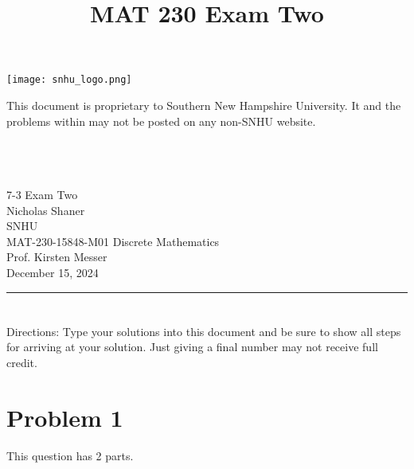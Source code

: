 \documentclass{amsart}
\theoremstyle{definition}
\theoremstyle{Exercise}
\theoremstyle{remark}
\theoremstyle{rule}
\numberwithin{equation}{section}
\begin{document}
\title{\sf MAT 230 Exam Two}%





\begin{center}
\texttt{[image: snhu\_logo.png]}
\end{center}

\maketitle
This document is proprietary to Southern New Hampshire University. It and the problems within may not be posted on any non-SNHU website.\\\\\\\\
\begin{center}\doublespacing
7-3 Exam Two\\
Nicholas Shaner\\
SNHU\\
MAT-230-15848-M01 Discrete Mathematics\\
Prof. Kirsten Messer\\
December 15, 2024\\
\end{center}

\begin{center}
\rule{\textwidth}{0.4pt}
\end{center}
\newpage
\section*{}
\section*{}
Directions: Type your solutions into this document and be sure to show all steps for arriving at your solution. Just giving a final number may not receive full credit.
\\
\section*{Problem 1}
 \noindent
 This question has 2 parts.
\end{document}
